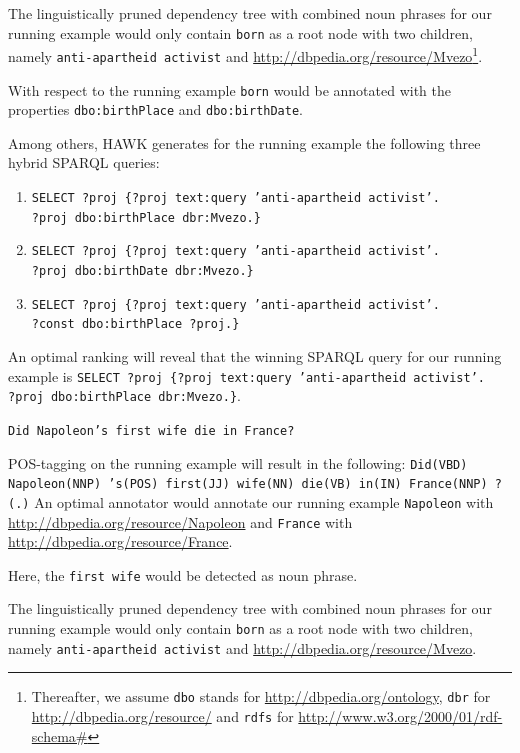 The linguistically pruned dependency tree with combined noun phrases for our running example would only contain \texttt{born} as a root node with two children, namely \texttt{anti-apartheid activist} and \url{http://dbpedia.org/resource/Mvezo}\footnote{Thereafter, we assume \texttt{dbo} stands for \url{http://dbpedia.org/ontology}, \texttt{dbr} for \url{http://dbpedia.org/resource/} and \texttt{rdfs} for \url{http://www.w3.org/2000/01/rdf-schema\#} }.

With respect to the running example \texttt{born} would be annotated with the properties \texttt{dbo:birthPlace} and \texttt{dbo:birthDate}.

Among others, HAWK generates for the running example the following three hybrid SPARQL queries:
\begin{enumerate}
\item \texttt{SELECT ?proj  \{?proj text:query 'anti-apartheid activist'.\\ ?proj dbo:birthPlace dbr:Mvezo.\}}
\item \texttt{SELECT ?proj  \{?proj text:query 'anti-apartheid activist'.\\ ?proj dbo:birthDate dbr:Mvezo.\}}
\item \texttt{SELECT ?proj  \{?proj text:query 'anti-apartheid activist'.\\ ?const dbo:birthPlace ?proj.\}}
\end{enumerate}

An optimal ranking will reveal that the winning SPARQL query for our running example is \texttt{SELECT ?proj  \{?proj text:query 'anti-apartheid activist'.\\ ?proj dbo:birthPlace dbr:Mvezo.\}}.

\texttt{Did Napoleon's first wife die in France?}

POS-tagging on the running example will result in the following: \texttt{Did(VBD) Napoleon(NNP) 's(POS) first(JJ) wife(NN) die(VB) in(IN) France(NNP) ?(.)}
An optimal annotator would annotate our running example \texttt{Napoleon} with \url{http://dbpedia.org/resource/Napoleon} and \texttt{France} with \url{http://dbpedia.org/resource/France}.

Here, the \texttt{first wife} would be detected as noun phrase.

The linguistically pruned dependency tree with combined noun phrases for our running example would only contain \texttt{born} as a root node with two children, namely \texttt{anti-apartheid activist} and \url{http://dbpedia.org/resource/Mvezo}.

